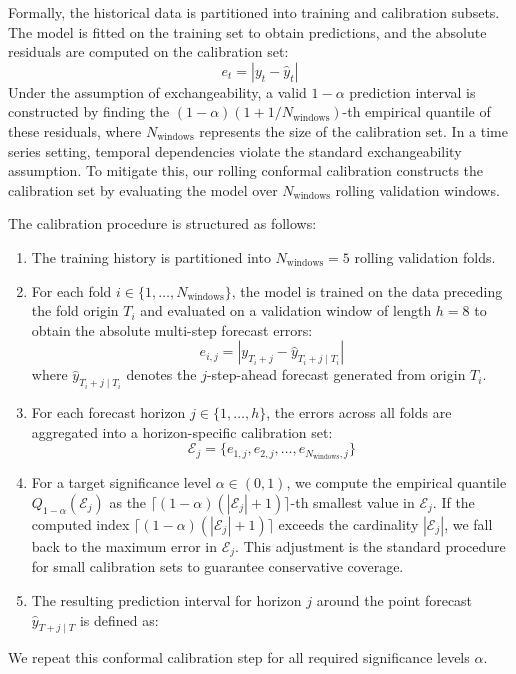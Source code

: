 Formally, the historical data is partitioned into training and calibration subsets. The model is fitted on the training set to obtain predictions, and the absolute residuals are computed on the calibration set:
\begin{equation}
e_{t} = |y_t - \hat{y}_t|
\end{equation}
Under the assumption of exchangeability, a valid $1 - \alpha$ prediction interval is constructed by finding the $(1 - \alpha)(1 + 1/N_{\text{windows}})$-th empirical quantile of these residuals, where $N_{\text{windows}}$ represents the size of the calibration set. In a time series setting, temporal dependencies violate the standard exchangeability assumption. To mitigate this, our rolling conformal calibration constructs the calibration set by evaluating the model over $N_{\text{windows}}$ rolling validation windows.

The calibration procedure is structured as follows:
\begin{enumerate}
    \item The training history is partitioned into $N_{\text{windows}}=5$ rolling validation folds.
    \item For each fold $i \in \{1, \dots, N_{\text{windows}}\}$, the model is trained on the data preceding the fold origin $T_i$ and evaluated on a validation window of length $h=8$ to obtain the absolute multi-step forecast errors:
    \begin{equation}
    e_{i, j} = |y_{T_i + j} - \hat{y}_{T_i + j \mid T_i}|
    \end{equation}
    where $\hat{y}_{T_i + j \mid T_i}$ denotes the $j$-step-ahead forecast generated from origin $T_i$.
    \item For each forecast horizon $j \in \{1, \dots, h\}$, the errors across all folds are aggregated into a horizon-specific calibration set:
    \begin{equation}
    \mathcal{E}_j = \{e_{1, j}, e_{2, j}, \dots, e_{N_{\text{windows}}, j}\}
    \end{equation}
    \item For a target significance level $\alpha \in (0, 1)$, we compute the empirical quantile $Q_{1-\alpha}(\mathcal{E}_j)$ as the $\lceil (1-\alpha)(|\mathcal{E}_j|+1) \rceil$-th smallest value in $\mathcal{E}_j$. If the computed index $\lceil (1-\alpha)(|\mathcal{E}_j|+1) \rceil$ exceeds the cardinality $|\mathcal{E}_j|$, we fall back to the maximum error in $\mathcal{E}_j$. This adjustment is the standard procedure for small calibration sets to guarantee conservative coverage.
    \item The resulting prediction interval for horizon $j$ around the point forecast $\hat{y}_{T+j \mid T}$ is defined as:
    \begin{equation}
    [\hat{y}_{T+j \mid T} - Q_{1-\alpha}(\mathcal{E}_j), \quad \hat{y}_{T+j \mid T} + Q_{1-\alpha}(\mathcal{E}_j)]
    \end{equation}
\end{enumerate}
We repeat this conformal calibration step for all required significance levels $\alpha$.

